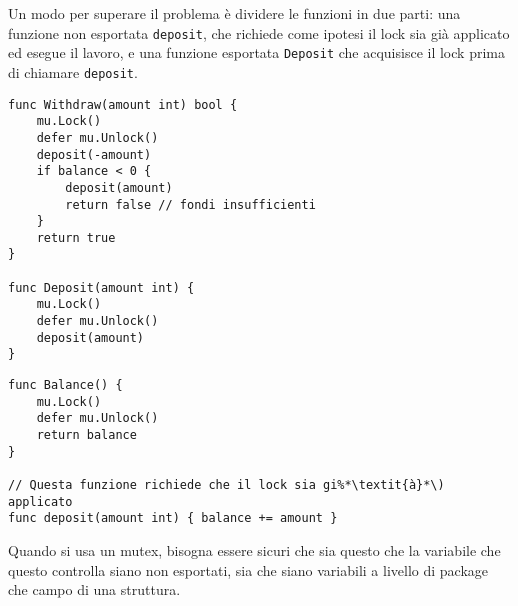 Un modo per superare il problema è dividere le funzioni in due parti: una funzione non esportata \verb|deposit|, che richiede come ipotesi il lock sia già applicato ed esegue il lavoro, e una funzione esportata \verb|Deposit| che acquisisce il lock prima di chiamare \verb|deposit|.
\begin{lstlisting}[frame=single, label={lst:lstlisting9-2.6}]
func Withdraw(amount int) bool {
    mu.Lock()
    defer mu.Unlock()
    deposit(-amount)
    if balance < 0 {
        deposit(amount)
        return false // fondi insufficienti
    }
    return true
}

func Deposit(amount int) {
    mu.Lock()
    defer mu.Unlock()
    deposit(amount)
}
\end{lstlisting}
\begin{lstlisting}[frame=single, label={lst:lstlisting9-2.7}]
func Balance() {
    mu.Lock()
    defer mu.Unlock()
    return balance
}

// Questa funzione richiede che il lock sia gi%*\textit{à}*\) applicato
func deposit(amount int) { balance += amount }
\end{lstlisting}
Quando si usa un mutex, bisogna essere sicuri che sia questo che la variabile che questo controlla siano non esportati, sia che siano variabili a livello di package che campo di una struttura.